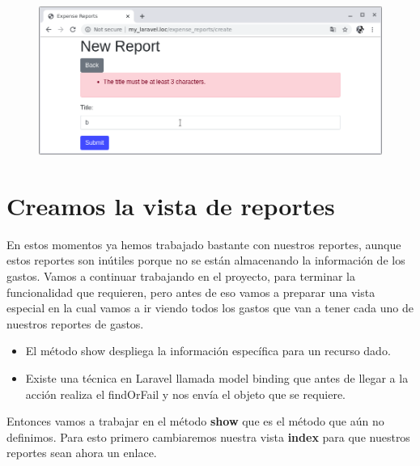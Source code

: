 \documentclass{article}
\begin{document}
\begin{figure}[h!]
  \centering
  \includegraphics[scale=0.5]{./Pictures/094_min3_error_old.png}
\end{figure}

\newpage

\section{Creamos la vista de reportes}%
En estos momentos ya hemos trabajado bastante con nuestros reportes, aunque
estos reportes son inútiles porque no se están almacenando la información de
los gastos. Vamos a continuar trabajando en el proyecto, para terminar la
funcionalidad que requieren, pero antes de eso vamos a preparar una vista
especial en la cual vamos a ir viendo todos los gastos que van a tener cada uno
de nuestros reportes de gastos.

\begin{itemize}
  \item El método show despliega la información específica para un recurso
    dado.
  \item Existe una técnica en Laravel llamada model binding que antes de llegar
    a la acción realiza el findOrFail y nos envía el objeto que se requiere.
\end{itemize}

Entonces vamos a trabajar en el método \textbf{show} que es el método que aún
no definimos. Para esto primero cambiaremos nuestra vista \textbf{index} para
que nuestros reportes sean ahora un enlace.\\
\end{document}
